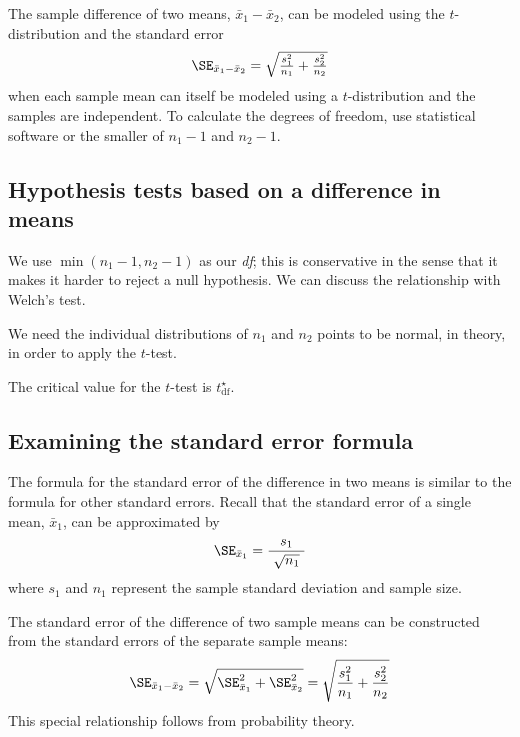 {\begin{termBox}{
The sample difference of two means, $\bar{x}_1 - \bar{x}_2$, can be modeled using the $t$-distribution and the standard error
\begin{eqnarray}
\textstyle
\SE_{\bar{x}_{1} - \bar{x}_{2}} = \sqrt{\frac{s_1^2}{n_1} + \frac{s_2^2}{n_2}}
\label{seOfDifferenceInMeans}
\end{eqnarray}
when each sample mean can itself be modeled using a $t$-distribution and the samples are independent. To calculate the degrees of freedom, use statistical software or the smaller of $n_1 - 1$ and $n_2 - 1$.}
\end{termBox}


\subsection{Hypothesis tests based on a difference in means}

We use $\min(n_1-1,n_2-1)$ as our \emph{df}; this is conservative in the sense that it makes it harder to reject a null hypothesis. We can discuss the relationship with Welch's test.

We need the individual distributions of $n_1$ and $n_2$ points to be normal, in theory, in order to apply the $t$-test.


The critical value for the $t$-test is $t^{\star}_{\text{df}}$. %



\subsection{Examining the standard error formula} %

The formula for the standard error of the difference in two means is similar to the formula for other standard errors. Recall that the standard error of a single mean, $\bar{x}_1$, can be approximated by\textC{\vspace{-3mm}}
\begin{align*}
\SE_{\bar{x}_1} = \frac{s_1}{\ \sqrt{n_1}\ }
\end{align*}
where $s_1$ and $n_1$ represent the sample standard deviation and sample size.

The standard error of the difference of two sample means can be constructed from the standard errors of the separate sample means:
\begin{eqnarray}
\SE_{\bar{x}_{1} - \bar{x}_{2}}
	= \sqrt{\SE_{\bar{x}_1}^2 + \SE_{\bar{x}_2}^2}
	= \sqrt{\frac{s_1^2}{{n_1}} + \frac{s_2^2}{{n_2}}}
\label{seOfDiffOfMeansInTermsOfSEOfIndividualMeans}
\end{eqnarray}
This special relationship follows from probability theory.

}
